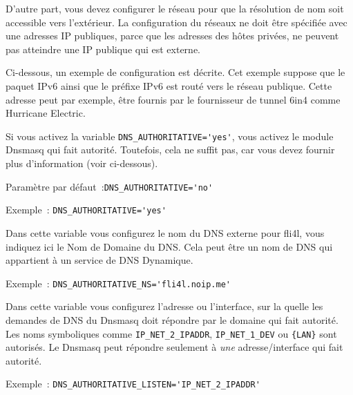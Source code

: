 	  D'autre part, vous devez configurer le réseau pour que la résolution de nom
	  soit accessible vers l'extérieur. La configuration du réseaux ne doit être
	  spécifiée avec une adresses IP publiques, parce que les adresses des hôtes
	  privées, ne peuvent pas atteindre une IP publique qui est externe.

	  Ci-dessous, un exemple de configuration est décrite. Cet exemple suppose que
	  le paquet IPv6 ainsi que le préfixe IPv6 est routé vers le réseau publique.
	  Cette adresse peut par exemple, être fournis par le fournisseur de tunnel 6in4
	  comme Hurricane Electric.

\begin{description}


      Si vous activez la variable \verb+DNS_AUTHORITATIVE='yes'+, vous activez
	  le module Dnsmasq qui fait autorité. Toutefois, cela ne suffit pas, car
	  vous devez fournir plus d'information (voir ci-dessous).

	  Paramètre par défaut~:\verb+DNS_AUTHORITATIVE='no'+

	  Exemple~: \verb+DNS_AUTHORITATIVE='yes'+


	  Dans cette variable vous configurez le nom du DNS externe pour fli4l, vous
	  indiquez ici le Nom de Domaine du DNS. Cela peut être un nom de DNS qui appartient
	  à un service de DNS Dynamique.

	  Exemple~: \verb+DNS_AUTHORITATIVE_NS='fli4l.noip.me'+


	  Dans cette variable vous configurez l'adresse ou l'interface, sur la quelle les
	  demandes de DNS du Dnsmasq doit répondre par le domaine qui fait autorité.
	  Les noms symboliques comme \verb+IP_NET_2_IPADDR+, \verb+IP_NET_1_DEV+ ou
    \verb+{LAN}+ sont autorisés. Le Dnsmasq peut répondre seulement à \emph{une}
    adresse/interface qui fait autorité.


	  Exemple~: \verb+DNS_AUTHORITATIVE_LISTEN='IP_NET_2_IPADDR'+



\end{description}
